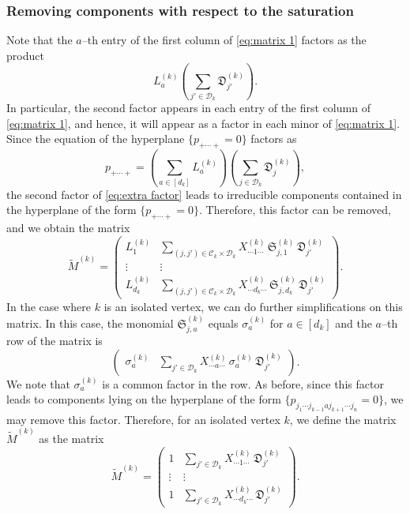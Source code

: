 \documentclass[11pt]{amsart}
\numberwithin{equation}{section}
\theoremstyle{plain}
\numberwithin{theorem}{section}
\theoremstyle{definition}
\begin{document}
\subsubsection{Removing components with respect to the saturation} Note that the $a$--th entry of the first column of \eqref{eq:matrix 1} factors as the product
 \begin{equation}\label{eq:extra factor}
 \displaystyle 
 L_a^{(k)}
 \left(
\sum_{j'\in\mathscr D_k}\mathfrak D_{j'}^{(k)}\right).
 \end{equation}
In particular, the second factor appears in each entry of the first column of \eqref{eq:matrix 1}, and hence, it will appear as a factor in each minor of \eqref{eq:matrix 1}. Since the equation of the hyperplane  $\{p_{+\cdots+}=0\}$ factors as
\[
\displaystyle p_{+\cdots+}=\left( \sum_{a\in[d_k]} L_a^{(k)}\right)\left(\sum_{j\in\mathscr{D}_k}\mathfrak{D}_j^{(k)}\right),
\]
the second factor of \eqref{eq:extra factor} leads to irreducible components  contained in the hyperplane of the form $\{p_{+\cdots+}=0\}$. Therefore,  this factor can be removed, and we obtain the matrix 
 \begin{equation}\label{eq:matrix 2}
\widetilde{M}^{(k)}=\begin{pmatrix}
\displaystyle
L_1^{(k)}& \displaystyle
\sum_{(j,j')\in\mathscr C_k\times\mathscr D_k}X_{\cdots 1\cdots}^{(k)}\,\mathfrak S_{j,1}^{(k)}\,\mathfrak D_{j'}^{(k)}\\ \vdots &\vdots \\
\displaystyle
L_{d_k}^{(k)}& \displaystyle
\sum_{(j,j')\in\mathscr C_k\times\mathscr D_k}X_{\cdots d_k\cdots}^{(k)}\,\mathfrak S_{j,d_k}^{(k)}\,\mathfrak D_{j'}^{(k)}
\end{pmatrix}.
 \end{equation}
 In the case where $k$ is an isolated vertex, we can do further simplifications on this matrix. In this case, the monomial $\mathfrak S_{j,a}^{(k)}$ equals $\sigma^{(k)}_a$ for $a\in [d_k]$ and the $a$--th row of the matrix is 
 \[
\begin{pmatrix}
    \displaystyle
\sigma^{(k)}_a& \displaystyle
\sum_{j'\in\mathscr D_k}X_{\cdots a\cdots}^{(k)}\,\sigma^{(k)}_a\,\mathfrak D_{j'}^{(k)}
\end{pmatrix}.
 \]
 We note that $\sigma^{(k)}_a$ is a common factor in the row. As before, since this factor leads to components lying on the hyperplane of the form $\{p_{j_1\cdots j_{k-1} a j_{k+1}\cdots j_n}=0\}$, we may remove this factor. Therefore, for an isolated vertex $k$, we define the matrix $\widetilde{M}^{(k)}$ as the matrix
 \begin{equation}\label{eq:matrix 3}
\widetilde{M}^{(k)}=\begin{pmatrix}
\displaystyle
1& \displaystyle
\sum_{j'\in\mathscr D_k}X_{\cdots 1\cdots}^{(k)}\,\mathfrak D_{j'}^{(k)}\\ \vdots &\vdots \\
\displaystyle
1& \displaystyle
\sum_{j'\in\mathscr D_k}X_{\cdots d_k\cdots}^{(k)}\,\mathfrak D_{j'}^{(k)}
\end{pmatrix}.
 \end{equation}
\end{document}
